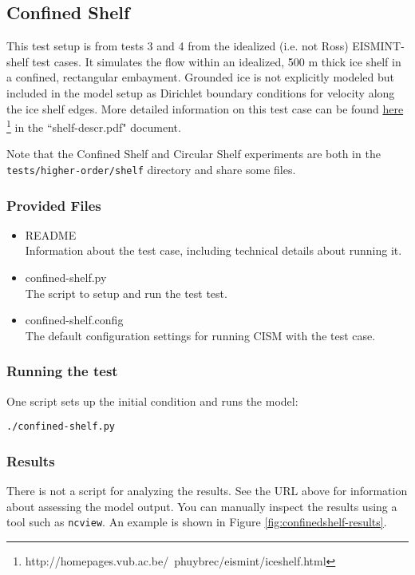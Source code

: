 \subsection{Confined Shelf}
This test setup is from tests 3 and 4 from the idealized (i.e. not Ross) EISMINT-shelf test 
cases.  It simulates the flow within an idealized, 500 m thick ice shelf in a 
confined, rectangular embayment.  Grounded ice is not explicitly modeled but included in the 
model setup as Dirichlet boundary conditions for velocity along the ice shelf edges.
More detailed information on this test case can be found 
\href{http://homepages.vub.ac.be/~phuybrec/eismint/iceshelf.html}{here}
\footnote{http://homepages.vub.ac.be/~phuybrec/eismint/iceshelf.html} in the 
``shelf-descr.pdf" document.

Note that the Confined Shelf and Circular Shelf experiments are both in the 
\texttt{tests/higher-order/shelf} directory and share some files.

\subsubsection{Provided Files}

\begin{itemize}
	\item README \\
		Information about the test case, including technical details about running it.
	\item confined-shelf.py \\
		The script to setup and run the test test.
	\item confined-shelf.config \\
  The default configuration settings for running CISM with the test case.
\end{itemize}

\subsubsection{Running the test}
One script sets up the initial condition and runs the model:

\texttt{./confined-shelf.py}

\subsubsection{Results}
There is not a script for analyzing the results.  See the URL above for information 
about assessing the model output.
You can manually inspect the results using a tool such as \texttt{ncview}.
An example is shown in Figure \ref{fig:confinedshelf-results}.

